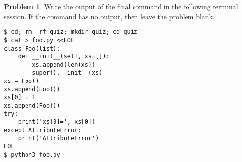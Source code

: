 \documentclass[10pt]{article}
\theoremstyle{definition}
\newtheorem{problem}{Problem}
\begin{document}
\filbreak
\begin{problem}
    Write the output of the final command in the following terminal session.
    If the command has no output, then leave the problem blank.
\end{problem}
\begin{lstlisting}
$ cd; rm -rf quiz; mkdir quiz; cd quiz
$ cat > foo.py <<EOF
class Foo(list):
    def __init__(self, xs=[]):
        xs.append(len(xs))
        super().__init__(xs)
xs = Foo()
xs.append(Foo())
xs[0] = 1
xs.append(Foo())
try:
    print('xs[0]=', xs[0])
except AttributeError:
    print('AttributeError') 
EOF
$ python3 foo.py
\end{lstlisting}

\end{document}
